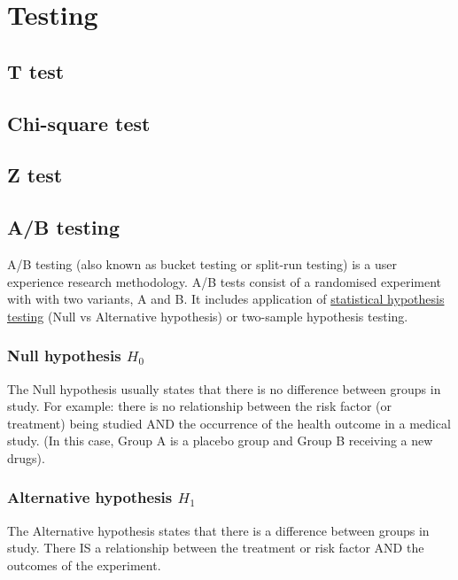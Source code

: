 \graphicspath{%
{chapter3graph/}%
{chapter3graph/bg/}}

\chapter{Testing}

\section{T test}

\section{Chi-square test}

\section{Z test}
\label{ztest}



\section{A/B testing}
\label{abtest}

A/B testing (also known as bucket testing or split-run testing) is a user experience research methodology. A/B tests consist of a randomised experiment with with two variants, A and B. It includes application of \underline{statistical hypothesis testing} (Null vs Alternative hypothesis) or two-sample hypothesis testing. \\


\subsection{Null hypothesis $H_0$}

The Null hypothesis usually states that there is no difference between groups in study. For example: there is no relationship between the risk factor (or treatment) being studied AND the occurrence of the health outcome in a medical study. (In this case, Group A is a placebo group and Group B receiving a new drugs).

\subsection{Alternative hypothesis $H_1$}

The Alternative hypothesis states that there is a difference between groups in study. There IS a relationship between the treatment or risk factor AND the outcomes of the experiment.\\

